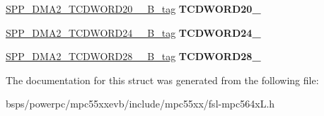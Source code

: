 \begin{DoxyCompactItemize}
\item 
\mbox{\label{structSPP__DMA2__CHANNEL__struct__tag_addc1edcd970e4984b81aa7cc81c999ea}} 
\mbox{\hyperlink{unionSPP__DMA2__TCDWORD20____32B__tag}{S\+P\+P\+\_\+\+D\+M\+A2\+\_\+\+T\+C\+D\+W\+O\+R\+D20\+\_\+\+\_\+B\+\_\+tag}} {\bfseries T\+C\+D\+W\+O\+R\+D20\+\_\+}
\item 
\mbox{\label{structSPP__DMA2__CHANNEL__struct__tag_a75247a699186cb205a6d288f21304f0a}} 
\mbox{\hyperlink{unionSPP__DMA2__TCDWORD24____32B__tag}{S\+P\+P\+\_\+\+D\+M\+A2\+\_\+\+T\+C\+D\+W\+O\+R\+D24\+\_\+\+\_\+B\+\_\+tag}} {\bfseries T\+C\+D\+W\+O\+R\+D24\+\_\+}
\item 
\mbox{\label{structSPP__DMA2__CHANNEL__struct__tag_a4227ecf3ef88311e14e4796014d80aa8}} 
\mbox{\hyperlink{unionSPP__DMA2__TCDWORD28____32B__tag}{S\+P\+P\+\_\+\+D\+M\+A2\+\_\+\+T\+C\+D\+W\+O\+R\+D28\+\_\+\+\_\+B\+\_\+tag}} {\bfseries T\+C\+D\+W\+O\+R\+D28\+\_\+}
\end{DoxyCompactItemize}


The documentation for this struct was generated from the following file\+:\begin{DoxyCompactItemize}
\item 
bsps/powerpc/mpc55xxevb/include/mpc55xx/fsl-\/mpc564x\+L.\+h\end{DoxyCompactItemize}
